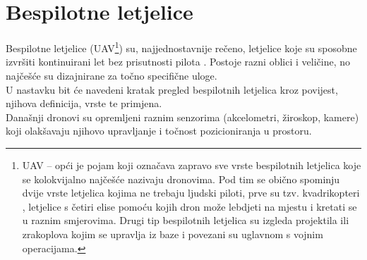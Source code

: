 \documentclass[times, utf8, diplomski]{fer}
\begin{document}
\section{Bespilotne letjelice}
Bespilotne letjelice (UAV\footnote{UAV  – opći je pojam koji označava zapravo sve vrste bespilotnih letjelica koje se kolokvijalno najčešće nazivaju dronovima. Pod tim se obično spominju dvije vrste letjelica kojima ne trebaju ljudski piloti, prve su tzv. kvadrikopteri , letjelice s četiri elise pomoću kojih dron može lebdjeti na mjestu i kretati se u raznim smjerovima. Drugi tip bespilotnih letjelica su izgleda projektila ili zrakoplova kojim se upravlja iz baze i povezani su uglavnom s vojnim operacijama.}) su, najjednostavnije rečeno, letjelice koje su sposobne izvršiti kontinuirani let bez prisutnosti pilota \citep{UAV}. Postoje razni oblici i veličine, no najčešće su dizajnirane za točno specifične uloge.\\
U nastavku bit će navedeni kratak pregled bespilotnih letjelica kroz povijest, njihova definicija, vrste te primjena.\\
Današnji dronovi su opremljeni raznim senzorima (akcelometri, žiroskop, kamere) koji olakšavaju njihovo upravljanje i točnost pozicioniranja u prostoru.
\end{document}

